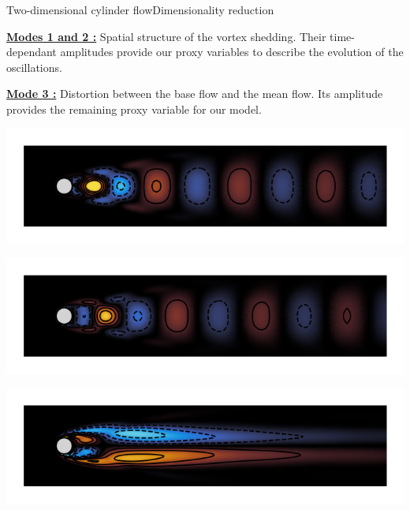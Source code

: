 \documentclass[usenames,dvipsnames,svgnames,10pt,aspectratio=169]{beamer}
\begin{document}
\begin{frame}[t, c]{Two-dimensional cylinder flow}{Dimensionality reduction}
  \begin{minipage}{.48\textwidth}
    \underline{\textbf{Modes 1 and 2 :}} Spatial structure of the vortex shedding.
    Their time-dependant amplitudes provide our proxy variables to describe the evolution of the oscillations.

    \bigskip

    \underline{\textbf{Mode 3 :}} Distortion between the base flow and the mean flow.
    Its amplitude provides the remaining proxy variable for our model.
  \end{minipage}%
  \hfill
  \begin{minipage}{.48\textwidth}
    \centering

    \includegraphics[width=\textwidth]{pod_mode}

    \medskip
    \includegraphics[width=\textwidth]{pod_mode_bis}

    \medskip
    \includegraphics[width=\textwidth]{shift_mode}

  \end{minipage}

  \vspace{1cm}
\end{frame}
\end{document}
